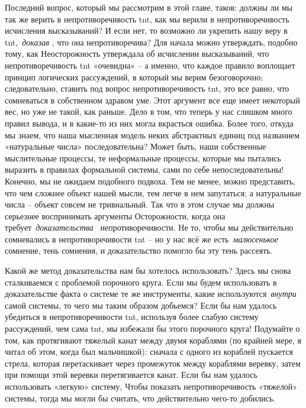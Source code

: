 \documentclass[../main.tex]{subfiles}
\begin{document}
Последний вопрос, который мы рассмотрим в этой главе, таков: должны ли мы так же верить в непротиворечивость \acs{tnt}, как мы верили в непротиворечивость исчисления высказываний? И если нет, то возможно ли укрепить нашу веру в \acs{tnt},~\emph{доказав} , что она непротиворечива? Для начала можно утверждать, подобно тому, как Неосторожность утверждала об исчислении высказываний, что непротиворечивость \acs{tnt} «очевидна» \--- а именно, что каждое правило воплощает принцип логических рассуждений, в который мы верим безоговорочно; следовательно, ставить под вопрос непротиворечивость \acs{tnt}, это все равно, что сомневаться в собственном здравом уме. Этот аргумент все еще имеет некоторый вес, но уже не такой, как раньше. Дело в том, что теперь у нас слишком много правил вывода, и в какие-то из них могла вкрасться ошибка. Более того, откуда мы знаем, что наша мысленная модель неких абстрактных единиц под названием «натуральные числа» последовательна? Может быть, наши собственные мыслительные процессы, те неформальные процессы, которые мы пытались выразить в правилах формальной системы, сами по себе непоследовательны! Конечно, мы не ожидаем подобного подвоха. Тем не менее, можно представить, что чем сложнее объект нашей мысли, тем легче в нем запутаться; а натуральные числа \--- объект совсем не тривиальный. Так что в этом случае мы должны серьезнее воспринимать аргументы Осторожности, когда она требует~\emph{доказательства~} непротиворечивости. Не то, чтобы мы действительно сомневались в непротиворечивости \acs{tnt} \--- но у нас всё же есть~\emph{малюсенькое~} сомнение, тень сомнения, и доказательство помогло бы эту тень рассеять.

Какой же метод доказательства нам бы хотелось использовать? Здесь мы снова сталкиваемся с проблемой порочного круга. Если мы будем использовать в доказательстве факта о системе те же инструменты, какие используются~\emph{внутри~} самой системы, то чего мы таким образом добьемся? Если бы нам удалось убедиться в непротиворечивости \acs{tnt}, используя более слабую систему рассуждений, чем сама \acs{tnt}, мы избежали бы этого порочного круга! Подумайте о том, как протягивают тяжелый канат между двумя кораблями (по крайней мере, я читал об этом, когда был мальчишкой): сначала с одного из кораблей пускается стрела, которая перетаскивает через промежуток между кораблями веревку, затем при помощи этой веревки перетягивается канат. Если бы нам удалось использовать «легкую» систему, Чтобы показать непротиворечивость «тяжелой» системы, тогда мы могли бы считать, что действительно чего-то добились.
\end{document}
